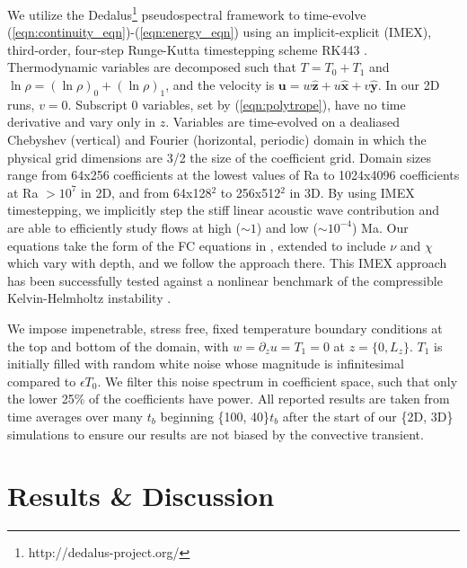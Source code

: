 \documentclass[aps, prfluids, onecolumn, notitlepage, nofootinbib, groupedaddress, amsfonts, amssymb, amsmath]{revtex4-1}
\begin{document}
We utilize the 
Dedalus\footnote{http://dedalus-project.org/} 
pseudospectral framework \cite{burns&all2016} to time-evolve  
(\ref{eqn:continuity_eqn})-(\ref{eqn:energy_eqn}) 
using an implicit-explicit (IMEX), third-order, four-step 
Runge-Kutta timestepping scheme RK443 \cite{ascher&all1997}.  
Thermodynamic variables are decomposed such that $T = T_0 + T_1$ and
$\ln\rho = (\ln\rho)_0 + (\ln\rho)_1$, 
and the velocity is $\bm{u} = w\bm{\hat{z}} + u\bm{\hat{x}} + v\bm{\hat{y}}$.
In our 2D runs, $v = 0$.
Subscript 0 variables, set by (\ref{eqn:polytrope}), 
have no time derivative and vary only in $z$.
Variables are time-evolved on a dealiased Chebyshev (vertical)
and Fourier (horizontal, periodic) domain in which the
physical grid dimensions are 3/2 the size of the coefficient grid.  
Domain sizes range from
64x256 coefficients at the lowest values of 
Ra to 1024x4096 coefficients at Ra $> 10^{7}$ in 2D,
and from 64x128$^2$ to  256x512$^2$ in 3D. 
By using IMEX timestepping, we implicitly step the 
stiff linear acoustic wave contribution and are able to
efficiently study flows at high ($\sim 1$) 
and low ($\sim 10^{-4}$) Ma.  Our equations take the form
of the FC equations in \cite{lecoanet&all2014}, extended to include
$\nu$ and $\chi$ which vary with depth, and we follow the approach there.
This IMEX approach has been successfully 
tested against a nonlinear benchmark  of the compressible 
Kelvin-Helmholtz instability \cite{Lecoanet_et_al_2016_KH}.

We impose impenetrable, stress free, fixed temperature boundary conditions at
the top and bottom of the domain, with 
$w = \partial_z u = T_1 = 0$ at $z = \{0, L_z\}$. 
$T_1$ is initially filled with
random white noise whose magnitude is infinitesimal
compared to $\epsilon T_0$.
We filter this noise spectrum in coefficient space, 
such that only the lower 25\% of the coefficients
have power. All reported results are taken from time averages
over many $t_b$ beginning \{100, 40\}$t_b$
after the start of our \{2D, 3D\} simulations to
ensure our results are not biased by the convective transient.

\section{Results \& Discussion}
\label{sec:results}
\end{document}
